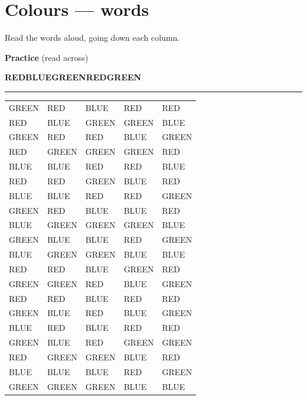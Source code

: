 \documentclass[12pt,a4paper]{article}
\begin{document}
\section*{Colours --- words}{\large Read the words aloud, going down each column.}
\par\medskip\textbf{Practice} (read across)\begin{center}\sffamily\Large\bfseries RED\qquad BLUE\qquad GREEN\qquad RED\qquad GREEN\end{center}\vspace{-4pt}\hrule\vspace{4pt}
\begin{center}\sffamily\Large\bfseries\begin{tabular}{@{}*{5}{p{2.6cm}<{\centering}}@{}}
GREEN & RED & BLUE & RED & RED\\[3pt]
RED & BLUE & GREEN & GREEN & BLUE\\[3pt]
GREEN & RED & RED & BLUE & GREEN\\[3pt]
RED & GREEN & GREEN & GREEN & RED\\[3pt]
BLUE & BLUE & RED & RED & BLUE\\[3pt]
RED & RED & GREEN & BLUE & RED\\[3pt]
BLUE & BLUE & RED & RED & GREEN\\[3pt]
GREEN & RED & BLUE & BLUE & RED\\[3pt]
BLUE & GREEN & GREEN & GREEN & BLUE\\[3pt]
GREEN & BLUE & BLUE & RED & GREEN\\[3pt]
BLUE & GREEN & GREEN & BLUE & BLUE\\[3pt]
RED & RED & BLUE & GREEN & RED\\[3pt]
GREEN & GREEN & RED & BLUE & GREEN\\[3pt]
RED & RED & BLUE & RED & RED\\[3pt]
GREEN & BLUE & RED & BLUE & GREEN\\[3pt]
BLUE & RED & BLUE & RED & RED\\[3pt]
GREEN & BLUE & RED & GREEN & GREEN\\[3pt]
RED & GREEN & GREEN & BLUE & RED\\[3pt]
BLUE & BLUE & BLUE & RED & GREEN\\[3pt]
GREEN & GREEN & GREEN & BLUE & BLUE\\[3pt]
\end{tabular}\end{center}\clearpage
\end{document}
